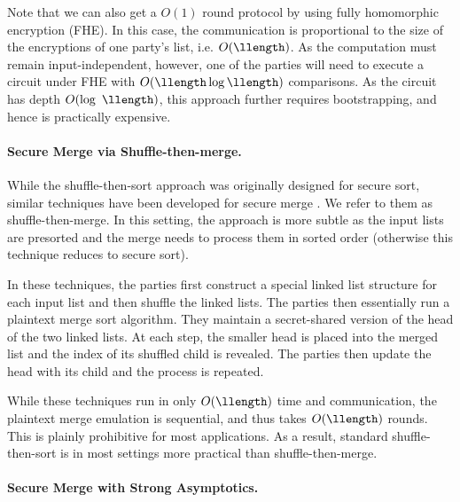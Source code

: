 Note that we can also get a $O(1)$ round protocol by using fully homomorphic encryption (FHE).
In this case, the communication is proportional to the size of the encryptions of one party's list, i.e. $O(\llength)$.
As the computation must remain input-independent, however, one of the parties will need to execute a circuit under FHE with $O(\llength\log\llength)$ comparisons. As the circuit has depth $O(\log~\llength)$, this approach further requires bootstrapping, and hence is practically expensive.

\paragraph{Secure Merge via Shuffle-then-merge.}

While the shuffle-then-sort approach was originally designed for secure sort, similar techniques have been developed for secure merge \cite{AC:CKNPS18,CSCML:FalNemOst22}. We refer to them as shuffle-then-merge. In this setting, the approach is more subtle as the input lists are presorted and the merge needs to process them in sorted order (otherwise this technique reduces to secure sort). 

In these techniques, the parties first construct a special linked list structure
for each input list and then shuffle the linked lists. 
The parties then essentially run a plaintext merge sort algorithm.
They maintain a secret-shared version of the head of the two
linked lists. At each step, the smaller head is placed into the merged list and the index of its shuffled child is revealed. The parties then update the head with its child and the process is repeated.

While these techniques run in only $O(\llength)$ time and communication, the plaintext merge emulation is sequential, and thus takes $O(\llength)$ rounds. This is plainly prohibitive for most applications. As a result, standard shuffle-then-sort is in most settings more practical than shuffle-then-merge.


\paragraph{Secure Merge with Strong Asymptotics.}

